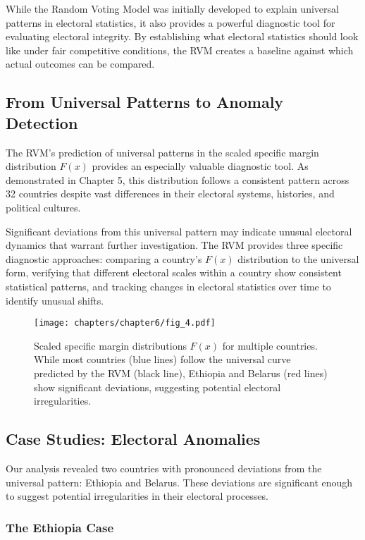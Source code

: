 While the Random Voting Model was initially developed to explain universal patterns in electoral statistics, it also provides a powerful diagnostic tool for evaluating electoral integrity. By establishing what electoral statistics should look like under fair competitive conditions, the RVM creates a baseline against which actual outcomes can be compared.

\subsection{From Universal Patterns to Anomaly Detection}

The RVM's prediction of universal patterns in the scaled specific margin distribution $F(x)$ provides an especially valuable diagnostic tool. As demonstrated in Chapter 5, this distribution follows a consistent pattern across 32 countries despite vast differences in their electoral systems, histories, and political cultures.

Significant deviations from this universal pattern may indicate unusual electoral dynamics that warrant further investigation. The RVM provides three specific diagnostic approaches: comparing a country's $F(x)$ distribution to the universal form, verifying that different electoral scales within a country show consistent statistical patterns, and tracking changes in electoral statistics over time to identify unusual shifts.

\begin{figure}[h]
    \centering
    \texttt{[image: chapters/chapter6/fig\_4.pdf]}
    \caption{Scaled specific margin distributions $F(x)$ for multiple countries. While most countries (blue lines) follow the universal curve predicted by the RVM (black line), Ethiopia and Belarus (red lines) show significant deviations, suggesting potential electoral irregularities.}
    \label{fig:anomalies}
\end{figure}

\subsection{Case Studies: Electoral Anomalies}

Our analysis revealed two countries with pronounced deviations from the universal pattern: Ethiopia and Belarus. These deviations are significant enough to suggest potential irregularities in their electoral processes.

\subsubsection{The Ethiopia Case}

